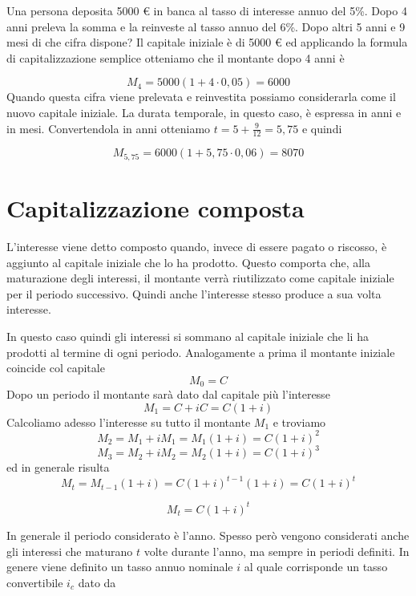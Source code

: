 \begin{exrig} \begin{esempio} Una persona deposita 5000 € in banca al tasso di 
interesse annuo del 5\%. Dopo 4 anni preleva la somma e la reinveste al tasso 
annuo del 6\%. Dopo altri 5 anni e 9 mesi di che cifra dispone? Il capitale 
iniziale è di 5000 € ed applicando la formula di capitalizzazione semplice 
otteniamo che il montante dopo 4 anni è

$$M_4 = 5000(1+4\cdot0,05) = 6000$$ Quando questa cifra viene prelevata e 
reinvestita possiamo considerarla come il nuovo capitale iniziale. La durata 
temporale, in questo caso, è espressa in anni e in mesi. Convertendola in anni 
otteniamo $t = 5 +\frac{9}{12} = 5,75$ e quindi

$$M_{5,75} = 6000(1+5,75\cdot0,06) = 8070$$ \end{esempio} \end{exrig}

\section{Capitalizzazione composta}

L'interesse viene detto composto quando, invece di essere pagato o riscosso, è 
aggiunto al capitale iniziale che lo ha prodotto. Questo comporta che, alla 
maturazione degli interessi, il montante verrà riutilizzato come capitale 
iniziale per il periodo successivo. Quindi anche l'interesse stesso produce a 
sua volta interesse.

In questo caso quindi gli interessi si sommano al capitale iniziale che li ha 
prodotti al termine di ogni periodo. Analogamente a prima il montante iniziale 
coincide col capitale $$ M_{0}=C $$ Dopo un periodo il montante sarà dato dal 
capitale più l'interesse $$M_{1}=C+iC=C(1+i)$$ Calcoliamo adesso l'interesse su 
tutto il montante $M_1$ e troviamo $$M_{2}=M_1+iM_1=M_1(1+i)=C(1+i)^2$$ 
$$M_{3}=M_2+iM_2=M_2(1+i)=C(1+i)^3$$ ed in generale risulta $$M_{t}=M_{t-1}(1+i) 
= C(1+i)^{t-1}(1+i)=C(1+i)^{t}$$

\begin{definizione} $$ M_{t}=C(1+i)^t $$ 
\end{definizione}

In generale il periodo considerato è l'anno. Spesso però vengono considerati 
anche gli interessi che maturano $t$ volte durante l'anno, ma sempre in periodi 
definiti. In genere viene definito un tasso annuo nominale $i$ al quale 
corrisponde un tasso convertibile $i_c$ dato da

